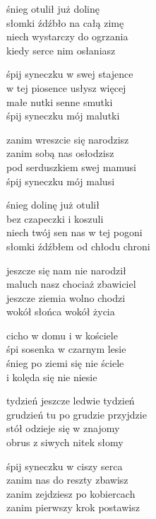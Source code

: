 \begin{text}
    śnieg otulił już dolinę\\
    słomki źdźbło na całą zimę\\
    niech wystarczy do ogrzania\\
    kiedy serce nim osłaniasz

    śpij syneczku w swej stajence\\
    w tej piosence usłysz więcej\\
    małe nutki senne smutki\\
    śpij syneczku mój malutki

    zanim wreszcie się narodzisz\\
    zanim sobą nas osłodzisz\\
    pod serduszkiem swej mamusi\\
    śpij syneczku mój malusi

    śnieg dolinę już otulił\\
    bez czapeczki i koszuli\\
    niech twój sen nas w tej pogoni\\
    słomki źdźbłem od chłodu chroni

    jeszcze się nam nie narodził\\
    maluch nasz chociaż zbawiciel\\
    jeszcze ziemia wolno chodzi\\
    wokół słońca wokół życia

    cicho w domu i w kościele\\
    śpi sosenka w czarnym lesie\\
    śnieg po ziemi się nie ściele\\
    i kolęda się nie niesie

    tydzień jeszcze ledwie tydzień\\
    grudzień tu po grudzie przyjdzie\\
    stół odzieje się w znajomy\\
    obrus z siwych nitek słomy

    śpij syneczku w ciszy serca\\
    zanim nas do reszty zbawisz\\
    zanim zejdziesz po kobiercach\\
    zanim pierwszy krok postawisz
\end{text}
\begin{chord}

\end{chord}